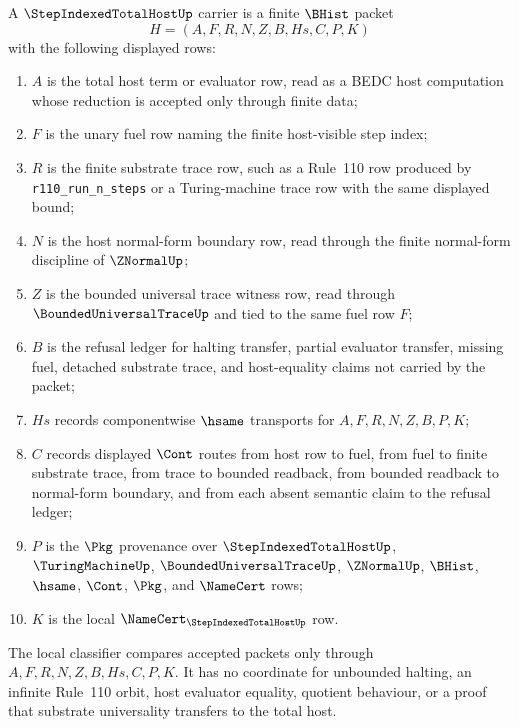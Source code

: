 \begin{definition}
\label{def:step-indexed-total-host-carrier}
A $\StepIndexedTotalHostUp$ carrier is a finite $\BHist$ packet
$$
H=(A,F,R,N,Z,B,Hs,C,P,K)
$$
with the following displayed rows:
\begin{enumerate}
\item $A$ is the total host term or evaluator row, read as a BEDC host computation whose reduction is accepted only through finite data;
\item $F$ is the unary fuel row naming the finite host-visible step index;
\item $R$ is the finite substrate trace row, such as a Rule~110 row produced by \texttt{r110\_run\_n\_steps} or a Turing-machine trace row with the same displayed bound;
\item $N$ is the host normal-form boundary row, read through the finite normal-form discipline of $\ZNormalUp$;
\item $Z$ is the bounded universal trace witness row, read through $\BoundedUniversalTraceUp$ and tied to the same fuel row $F$;
\item $B$ is the refusal ledger for halting transfer, partial evaluator transfer, missing fuel, detached substrate trace, and host-equality claims not carried by the packet;
\item $Hs$ records componentwise $\hsame$ transports for $A,F,R,N,Z,B,P,K$;
\item $C$ records displayed $\Cont$ routes from host row to fuel, from fuel to finite substrate trace, from trace to bounded readback, from bounded readback to normal-form boundary, and from each absent semantic claim to the refusal ledger;
\item $P$ is the $\Pkg$ provenance over $\StepIndexedTotalHostUp$, $\TuringMachineUp$, $\BoundedUniversalTraceUp$, $\ZNormalUp$, $\BHist$, $\hsame$, $\Cont$, $\Pkg$, and $\NameCert$ rows;
\item $K$ is the local $\NameCert_{\StepIndexedTotalHostUp}$ row.
\end{enumerate}
The local classifier compares accepted packets only through $A,F,R,N,Z,B,Hs,C,P,K$. It has no coordinate for unbounded halting, an infinite Rule~110 orbit, host evaluator equality, quotient behaviour, or a proof that substrate universality transfers to the total host.
\end{definition}

